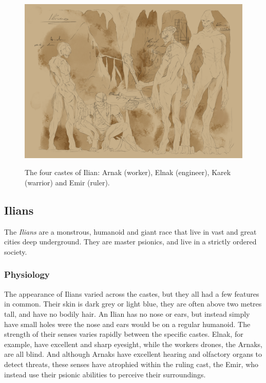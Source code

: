 \begin{figure}[ht!]
    \centering
    \vspace{-2.6cm}
    \centerline{
        \includegraphics[width=\paperwidth,keepaspectratio]{media/ilians_sm.png}
    }
    \par
    The four castes of Ilian: Arnak (worker), Elnak (engineer), Karek
    (warrior) and Emir (ruler).
\end{figure}

\subsection{Ilians}
\label{sec:Ilians}

The \emph{Ilians} are a monstrous, humanoid and giant race that live in vast
and great cities deep underground. They are master psionics, and live in a
strictly ordered society.

\subsubsection{Physiology}

The appearance of Ilians varied across the castes, but they all had a few
features in common. Their skin is dark grey or light blue, they are often
above two metres tall, and have no bodily hair. An Ilian has no nose or ears,
but instead simply have small holes were the nose and ears would be on a
regular humanoid. The strength of their senses varies rapidly between the
specific castes. Elnak, for example, have excellent and sharp eyesight, while
the workers drones, the Arnaks, are all blind. And although Arnaks have
excellent hearing and olfactory organs to detect threats, these senses have
atrophied within the ruling cast, the Emir, who instead use their psionic
abilities to perceive their surroundings.


